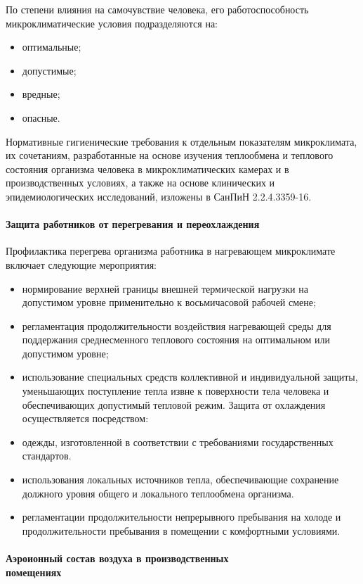 По степени влияния на самочувствие человека, его работоспособность микроклиматические условия подразделяются на:
\begin{itemize}
	\item оптимальные;
	\item допустимые;
	\item вредные;
	\item опасные.
\end{itemize}

Нормативные гигиенические требования к отдельным показате­лям микроклимата, их сочетаниям, разработанные на основе изучения теплообмена и теплового состояния организма человека в микро­климатических камерах и в производственных условиях, а также на основе клинических и эпидемиологических исследований, изложены в СанПиН 2.2.4.3359-16.

\paragraph{Защита работников от перегревания и переохлаждения}
Профилактика перегрева организма работника в нагревающем микроклимате включает следующие мероприятия:
\begin{itemize}
	\item нормирование верхней границы внешней термической нагрузки на допустимом уровне применительно к восьмичасовой рабочей смене;
	\item регламентация продолжительности воздействия нагревающей среды для поддержания среднесменного теплового состояния на опти­мальном или допустимом уровне;
	\item использование специальных средств коллективной и индивиду­альной защиты, уменьшающих поступление тепла извне к поверхности тела человека и обеспечивающих допустимый тепловой режим.
Защита от охлаждения осуществляется посредством:
	\item одежды, изготовленной в соответствии с требованиями государственных стандартов.
	\item использования локальных источников тепла, обеспечивающие сохранение должного уровня общего и локального теплообмена организма.
	\item регламентации продолжительности непрерывного пребывания на холоде и продолжительности пребывания в помещении с комфортными условиями. 
\end{itemize}

\paragraph{Аэроионный состав воздуха в производственных \\помещениях}

